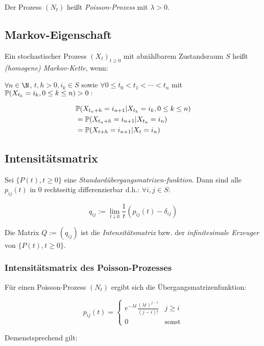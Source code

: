 Der Prozess $(N_t)$ heißt \emph{Poisson-Prozess} mit $\lambda > 0$.

\subsection*{Markov-Eigenschaft}

Ein stochastischer Prozess $(X_t)_{t\geq0}$ mit abzählbarem Zustandsraum $S$ heißt \emph{(homogene) Markov-Kette}, wenn:

$\forall n \in \N$, $t, h > 0, i_k \in S$ sowie $\forall 0 \leq t_0 < t_1 < \cdots < t_n$ mit $\P(X_{t_k} = i_k, 0 \leq k \leq n) > 0 : $

\vspace*{-4mm}
\begin{align*}
&\P(X_{t_n+h} = i_{n+1} | X_{t_k} = i_k, 0 \leq k \leq n) \\
&= \P(X_{t_n+h} = i_{n+1} | X_{t_n} = i_n) \\
&= \P(X_{t+h} = i_{n+1} | X_t = i_n)
\end{align*}

\subsection*{Intensitätsmatrix}

Sei $\{P(t), t \geq 0\}$ eine \emph{Standardübergangsmatrizen-funktion}. Dann sind alle $p_{ij}(t)$ in $0$ rechtseitig differenzierbar d.h.: $\forall i, j \in S :$

\vspace*{-2mm}
$$q_{ij} := \lim_{t\downarrow0} \frac{1}{t} (p_{ij}(t) - \delta_{ij})$$

Die Matrix $Q := (q_{ij})$ ist die \emph{Intensitätsmatrix} bzw. der \emph{infinitesimale Erzeuger} von $\{P(t),t \geq 0\}$.

\subsubsection*{Intensitätsmatrix des Poisson-Prozesses}

Für einen Poisson-Prozess $(N_t)$ ergibt sich die Übergangsmatrizenfunktion:

$$p_{ij}(t) = \begin{cases} e^{-\lambda t} \frac{(\lambda t)^{j-i}}{(j-i)!} & j \geq i \\ 0 & \text{sonst}\end{cases}$$

Demenstsprechend gilt:

